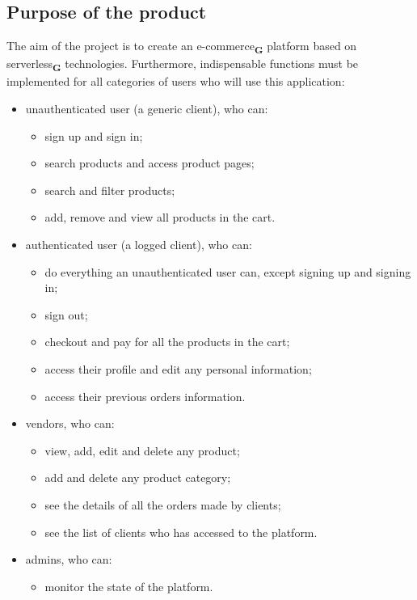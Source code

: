 \subsection{Purpose of the product}
The aim of the project is to create an e-commerce\textsubscript{\textbf{G}} platform based on serverless\textsubscript{\textbf{G}} technologies.
Furthermore, indispensable functions must be implemented for all categories of users who will use this application:
\begin{itemize}
    \item unauthenticated user (a generic client), who can:
          \begin{itemize}
              \item sign up and sign in;
              \item search products and access product pages;
              \item search and filter products;
              \item add, remove and view all products in the cart.
          \end{itemize}
    \item authenticated user (a logged client), who can:
          \begin{itemize}
              \item do everything an unauthenticated user can, except signing up and signing in;
              \item sign out;
              \item checkout and pay for all the products in the cart;
              \item access their profile and edit any personal information;
              \item access their previous orders information.
          \end{itemize}
    \item vendors, who can:
          \begin{itemize}
              \item view, add, edit and delete any product;
              \item add and delete any product category;
              \item see the details of all the orders made by clients;
              \item see the list of clients who has accessed to the platform.
          \end{itemize}
    \item admins, who can:
          \begin{itemize}
              \item monitor the state of the platform.
          \end{itemize}
\end{itemize}
